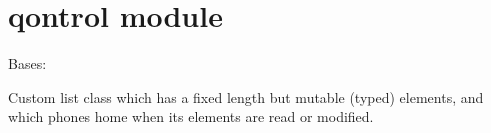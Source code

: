 \documentclass[letterpaper,10pt,english]{sphinxmanual}
\begin{document}
\section{qontrol module}
\label{\detokenize{qontrol::doc}}\label{\detokenize{qontrol:qontrol-module}}\label{\detokenize{qontrol:module-qontrol}}

\begin{fulllineitems}
\label{\detokenize{qontrol:qontrol.ChannelVector}}
Bases: 

Custom list class which has a fixed length but mutable (typed) elements, and which phones home when its elements are read or modified.

\begin{fulllineitems}
\label{\detokenize{qontrol:qontrol.ChannelVector.get_handle}}
\end{fulllineitems}


\begin{fulllineitems}
\label{\detokenize{qontrol:qontrol.ChannelVector.set_handle}}
\end{fulllineitems}


\begin{fulllineitems}
\label{\detokenize{qontrol:qontrol.ChannelVector.valid_types}}
\end{fulllineitems}


\end{fulllineitems}

\end{document}
